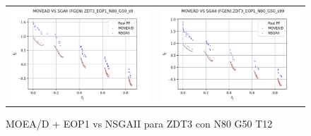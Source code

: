 \begin{figure}[H]
\begin{tabular}{c c}
    \includegraphics[scale=0.5]{figures/ZDT3_EOP1_N80_G50_T12/s9_comp.png} &
    \includegraphics[scale=0.5]{figures/ZDT3_EOP1_N80_G50_T12/s99_comp.png}\\
    \end{tabular}
    \caption{\centering MOEA/D + EOP1 vs NSGAII para ZDT3 con N80 G50 T12}
    \label{fig:9}
\end{figure}


